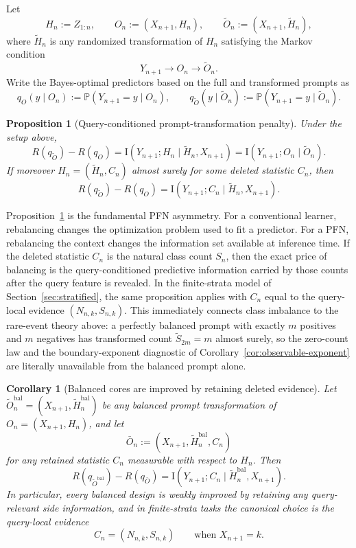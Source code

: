 \documentclass{article}
\newtheorem{proposition}[theorem]{Proposition}
\newtheorem{corollary}[theorem]{Corollary}
\theoremstyle{definition}
\theoremstyle{remark}
\newcommand{\Pbb}{\mathbb{P}}
\newcommand{\I}{\mathrm{I}}
\begin{document}
Let
\[
H_n:=Z_{1:n},
\qquad
O_n := (X_{n+1},H_n),
\qquad
\widetilde O_n := (X_{n+1},\widetilde H_n),
\]
where $\widetilde H_n$ is any randomized transformation of $H_n$ satisfying the Markov condition
\[
Y_{n+1} \to O_n \to \widetilde O_n.
\]
Write the Bayes-optimal predictors based on the full and transformed prompts as
\[
q_O(y\mid O_n):=\Pbb(Y_{n+1}=y\mid O_n),
\qquad
q_{\widetilde O}(y\mid \widetilde O_n):=\Pbb(Y_{n+1}=y\mid \widetilde O_n).
\]

\begin{proposition}[Query-conditioned prompt-transformation penalty]
\label{prop:prompt-transform}
Under the setup above,
\[
R(q_{\widetilde O})-R(q_O)
=
\I(Y_{n+1};H_n\mid \widetilde H_n,X_{n+1})
=
\I(Y_{n+1};O_n\mid \widetilde O_n).
\]
If moreover $H_n=(\widetilde H_n,C_n)$ almost surely for some deleted statistic $C_n$, then
\[
R(q_{\widetilde O})-R(q_O)
=
\I(Y_{n+1};C_n\mid \widetilde H_n,X_{n+1}).
\]
\end{proposition}

Proposition~\ref{prop:prompt-transform} is the fundamental PFN asymmetry. For a conventional learner, rebalancing changes the optimization problem used to fit a predictor. For a PFN, rebalancing the context changes the information set available at inference time. If the deleted statistic $C_n$ is the natural class count $S_n$, then the exact price of balancing is the query-conditioned predictive information carried by those counts after the query feature is revealed. In the finite-strata model of Section~\ref{sec:stratified}, the same proposition applies with $C_n$ equal to the query-local evidence $(N_{n,k},S_{n,k})$. This immediately connects class imbalance to the rare-event theory above: a perfectly balanced prompt with exactly $m$ positives and $m$ negatives has transformed count $\widetilde S_{2m}=m$ almost surely, so the zero-count law and the boundary-exponent diagnostic of Corollary~\ref{cor:observable-exponent} are literally unavailable from the balanced prompt alone.

\begin{corollary}[Balanced cores are improved by retaining deleted evidence]
\label{cor:balanced-plus}
Let $\widetilde O_n^{\mathrm{bal}}=(X_{n+1},\widetilde H_n^{\mathrm{bal}})$ be any balanced prompt transformation of $O_n=(X_{n+1},H_n)$, and let
\[
\bar O_n := (X_{n+1},\widetilde H_n^{\mathrm{bal}},C_n)
\]
for any retained statistic $C_n$ measurable with respect to $H_n$. Then
\[
R(q_{\widetilde O^{\mathrm{bal}}})-R(q_{\bar O})
=
\I(Y_{n+1};C_n\mid \widetilde H_n^{\mathrm{bal}},X_{n+1}).
\]
In particular, every balanced design is weakly improved by retaining any query-relevant side information, and in finite-strata tasks the canonical choice is the query-local evidence
\[
C_n=(N_{n,k},S_{n,k})
\qquad\text{when } X_{n+1}=k.
\]
\end{corollary}
\end{document}
